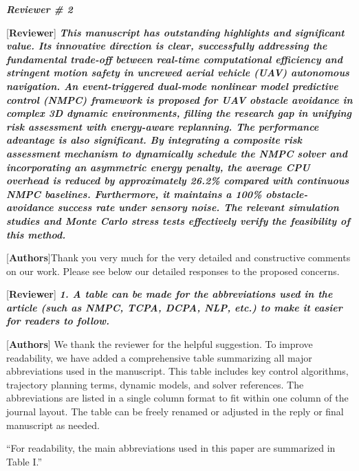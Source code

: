 \documentclass[12pt, twosides]{article}
\theoremstyle{definition}
\begin{document}
\vfill
\newpage
\begin{center}
\textbf{\textit{\large Reviewer \# 2}}
\end{center}

\textcolor[rgb]{0.00,0.00,1.00}{[\textbf {Reviewer}]} \textit{\textbf{This manuscript has outstanding highlights and significant value. Its innovative direction is clear, successfully addressing the fundamental trade-off between real-time computational efficiency and stringent motion safety in uncrewed aerial vehicle (UAV) autonomous navigation. An event-triggered dual-mode nonlinear model predictive control (NMPC) framework is proposed for UAV obstacle avoidance in complex 3D dynamic environments, filling the research gap in unifying risk assessment with energy-aware replanning. The performance advantage is also significant. By integrating a composite risk assessment mechanism to dynamically schedule the NMPC solver and incorporating an asymmetric energy penalty, the average CPU overhead is reduced by approximately 26.2\% compared with continuous NMPC baselines. Furthermore, it maintains a 100\% obstacle-avoidance success rate under sensory noise. The relevant simulation studies and Monte Carlo stress tests effectively verify the feasibility of this method.}}

\textcolor[rgb]{0.00,0.00,1.00}{[\textbf{Authors}]}Thank you very much for the very detailed and constructive comments on our work. Please see below our detailed responses to the proposed concerns.
\medskip

\textcolor[rgb]{0.00,0.00,1.00}{[\textbf {Reviewer}]} \textit{\textbf{1. A table can be made for the abbreviations used in the article (such as NMPC, TCPA, DCPA, NLP, etc.) to make it easier for readers to follow.}}

\textcolor[rgb]{0.00,0.00,1.00}{[\textbf{Authors}]} We thank the reviewer for the helpful suggestion. To improve readability, we have added a comprehensive table summarizing all major abbreviations used in the manuscript. This table includes key control algorithms, trajectory planning terms, dynamic models, and solver references. The abbreviations are listed in a single column format to fit within one column of the journal layout. The table can be freely renamed or adjusted in the reply or final manuscript as needed. 

``For readability, the main abbreviations used in this paper are summarized in Table I.'' 
\end{document}
